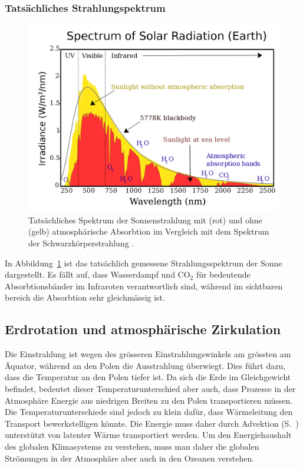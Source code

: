 \subsubsection{Tatsächliches Strahlungspektrum}
\begin{figure}
\centering
\includegraphics[width=0.7\hsize]{chapters/1/Solar_spectrum_en.png}
\caption{Tatsächliches Spektrum der Sonnenstrahlung mit (rot) und
ohne (gelb) atmosphärische Absorbtion im Vergleich mit dem Spektrum
der Schwarzkörperstrahlung \cite{skript:sunlight}.
\label{skript:strahlungsspektrum}}
\end{figure}
In Abbildung~\ref{skript:strahlungsspektrum} ist das tatsächlich gemessene
Strahlungsspektrum der Sonne dargestellt.
Es fällt auf, dass Wasserdampf und $\text{CO}_2$  für bedeutende
Absorbtionsbänder im Infraroten verantwortlich sind,
während im sichtbaren bereich
die Absorbtion sehr gleichmässig ist.

\subsection{Erdrotation und atmosphärische Zirkulation\label{skript:section:zirkulation}}
Die Einstrahlung ist wegen des grösseren Einstrahlungswinkels
am grössten am Äquator, während an den Polen die Ausstrahlung überwiegt.
Dies führt dazu, dass die Temperatur an den Polen tiefer ist.
Da sich die Erde im Gleichgewicht befindet, bedeutet dieser
Temperaturunterschied aber auch, dass Prozesse in
der Atmosphäre Energie aus niedrigen Breiten zu den Polen
transportieren müssen.
Die Temperaturunterschiede sind jedoch zu klein dafür, dass Wärmeleitung
den Transport bewerkstelligen könnte.
Die Energie muss daher durch Advektion (S.~\pageref{skript:advektion1})
unterstützt von latenter Wärme transportiert werden.
Um den Energiehaushalt des globalen Klimasystems zu verstehen, muss
%
%
man daher die globalen Strömungen in der Atmosphäre aber auch in
den Ozeanen verstehen.

